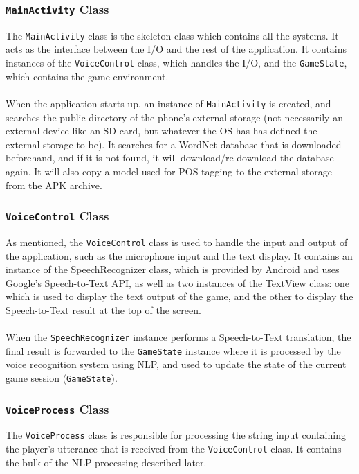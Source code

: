 \documentclass[12pt]{article}
\begin{document}
\subsubsection{\texttt{MainActivity} Class}

The \texttt{MainActivity} class is the skeleton class which contains all the systems. It acts as the interface between the I/O and the rest of the application. It contains instances of the \texttt{VoiceControl} class, which handles the I/O, and the \texttt{GameState}, which contains the game environment.
\\
\\
When the application starts up, an instance of \texttt{MainActivity} is created, and searches the public directory of the phone's external storage (not necessarily an external device like an SD card, but whatever the OS has has defined the external storage to be). It searches for a WordNet database that is downloaded beforehand, and if it is not found, it will download/re-download the database again. It will also copy a model used for POS tagging to the external storage from the APK archive.

\subsubsection{\texttt{VoiceControl} Class}

As mentioned, the \texttt{VoiceControl} class is used to handle the input and output of the application, such as the microphone input and the text display. It contains an instance of the SpeechRecognizer class, which is provided by Android and uses Google's Speech-to-Text API, as well as two instances of the TextView class: one which is used to display the text output of the game, and the other to display the Speech-to-Text result at the top of the screen.
\\
\\
When the \texttt{SpeechRecognizer} instance performs a Speech-to-Text translation, the final result is forwarded to the \texttt{GameState} instance where it is processed by the voice recognition system using NLP, and used to update the state of the current game session (\texttt{GameState}).

\subsubsection{\texttt{VoiceProcess} Class}

The \texttt{VoiceProcess} class is responsible for processing the string input containing the player's utterance that is received from the \texttt{VoiceControl} class. It contains the bulk of the NLP processing described later.
\end{document}
